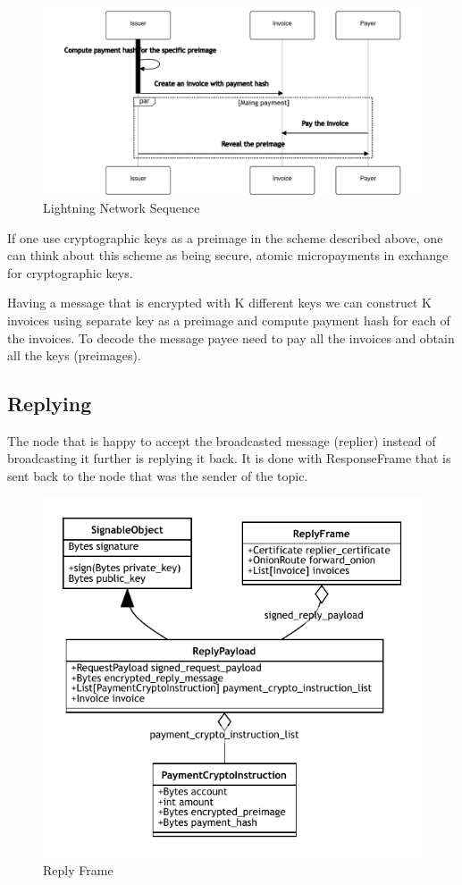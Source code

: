 \documentclass{article}
\begin{document}
\begin{figure}
	\centering
	\includegraphics[scale=0.6]{LNDSequence.pdf}
	\caption{Lightning Network Sequence}
	\label{fig:fr:lndsequence}
\end{figure}

If one use cryptographic keys as a preimage in the scheme described above, one can think about this scheme as being secure, atomic micropayments in exchange for cryptographic keys.

Having a message that is encrypted with K different keys we can construct K invoices using separate key as a preimage and compute payment hash for each of the invoices. To decode the message payee need to pay all the invoices and obtain all the keys (preimages).

\subsection{Replying}
The node that is happy to accept the broadcasted message (replier) instead of broadcasting it further is replying it back. It is done with ResponseFrame that is sent back to the node that was the sender of the topic.


\begin{figure}
	\centering
	\includegraphics[scale=1.0]{ReplyFrame.pdf}
	\caption{Reply Frame}
	\label{fig:fr:replyframe}
\end{figure}
\end{document}
